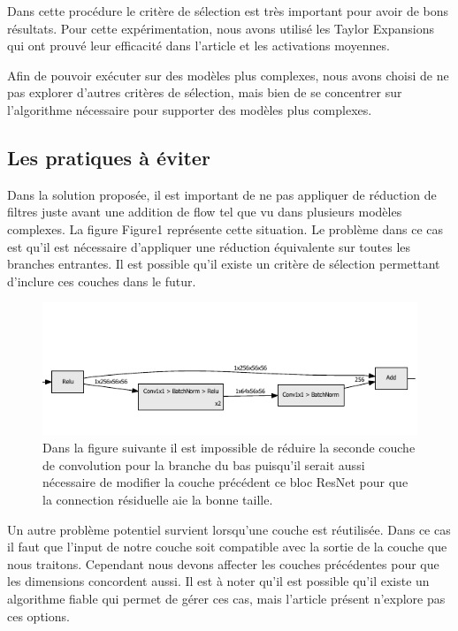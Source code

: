 \documentclass[12pt]{article}
\begin{document}
Dans cette procédure le critère de sélection est très important pour avoir de bons résultats. Pour cette expérimentation, nous avons utilisé les Taylor Expansions qui ont prouvé leur efficacité dans l'article et les activations moyennes. 

Afin de pouvoir exécuter sur des modèles plus complexes, nous avons choisi de ne pas explorer d'autres critères de sélection, mais bien de se concentrer sur l'algorithme nécessaire pour supporter des modèles plus complexes. 

\subsection{Les pratiques à éviter }
Dans la solution proposée, il est important de ne pas appliquer de réduction de filtres juste avant une addition de flow tel que vu dans plusieurs modèles complexes. La figure Figure1 représente cette situation. Le problème dans ce cas est qu’il est nécessaire d’appliquer une réduction équivalente sur toutes les branches entrantes.  Il est possible qu’il existe un critère de sélection permettant d’inclure ces couches dans le futur. 

\begin{figure}[H]
	\centering
	\includegraphics{residual_add}
	\caption{Dans la figure suivante il est impossible de réduire la seconde couche de convolution pour la branche du bas puisqu'il serait aussi nécessaire de modifier la couche précédent ce bloc ResNet pour que la connection résiduelle aie la bonne taille.}
	\label{fig:residualadd}
\end{figure}

Un autre problème potentiel survient lorsqu'une couche est réutilisée. Dans ce cas il faut que l'input de notre couche soit compatible avec la sortie de la couche que nous traitons. Cependant nous devons affecter les couches précédentes pour que les dimensions concordent aussi.
\newpage
Il est à noter qu'il est possible qu'il existe un algorithme fiable qui permet de gérer ces cas, mais l'article présent n'explore pas ces options.
\end{document}
